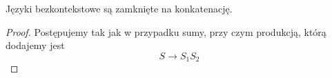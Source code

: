 \begin{theorem}
    Języki bezkontekstowe są zamknięte na konkatenację.
\end{theorem}
\begin{proof}
    Postępujemy tak jak w przypadku sumy, przy czym produkcją, którą dodajemy jest
    \[
        S \rightarrow S_1S_2
    \]
\end{proof}